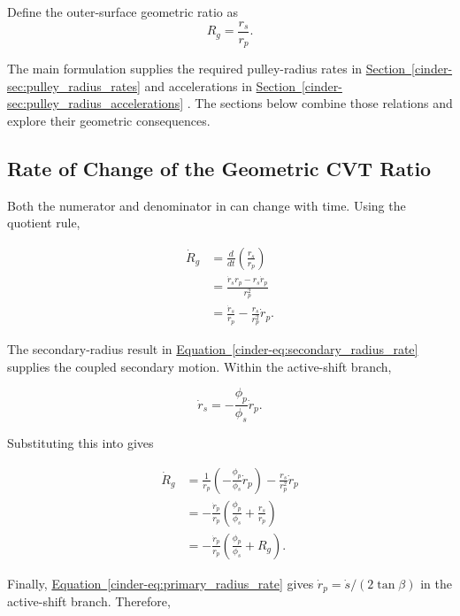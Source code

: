 \documentclass[11pt]{report}
\newcommand{\FormEq}[1]{%
    \hyperref[cinder-#1]{Equation~\ref*{cinder-#1}}%
  }
\newcommand{\FormSec}[1]{%
    \hyperref[cinder-#1]{Section~\ref*{cinder-#1}}%
  }
\newcommand{\FormEq}[1]{\textit{main formulation equation \nolinkurl{#1}}}
\newcommand{\FormSec}[1]{\textit{main formulation section \nolinkurl{#1}}}
\begin{document}
Define the outer-surface geometric ratio as
\begin{equation}
R_g=\frac{r_s}{r_p}.
\label{eq:geometric_ratio_recalled}
\end{equation}

The main formulation supplies the required pulley-radius rates in
\FormSec{sec:pulley_radius_rates} and accelerations in
\FormSec{sec:pulley_radius_accelerations}. The sections below combine those
relations and explore their geometric consequences.

\subsection{Rate of Change of the Geometric CVT Ratio}

Both the numerator and denominator in  can
change with time. Using the quotient rule,

\begin{align}
\dot R_g
&=
\frac{d}{dt}
\left(
\frac{r_s}{r_p}
\right)
\nonumber\\
&=
\frac{
\dot r_s r_p-r_s\dot r_p
}
{r_p^2}
\nonumber\\
&=
\frac{\dot r_s}{r_p}
-
\frac{r_s}{r_p^2}\dot r_p.
\label{eq:geometric_ratio_rate_general}
\end{align}

The secondary-radius result in \FormEq{eq:secondary_radius_rate} supplies the
coupled secondary motion. Within the active-shift branch,

\begin{equation}
\dot r_s
=
-\frac{\phi_p}{\phi_s}\dot r_p.
\label{eq:geometric_ratio_secondary_rate_substitution}
\end{equation}

Substituting this into  gives

\begin{align}
\dot R_g
&=
\frac{1}{r_p}
\left(
-\frac{\phi_p}{\phi_s}\dot r_p
\right)
-
\frac{r_s}{r_p^2}\dot r_p
\nonumber\\
&=
-\frac{\dot r_p}{r_p}
\left(
\frac{\phi_p}{\phi_s}
+
\frac{r_s}{r_p}
\right)
\nonumber\\
&=
-\frac{\dot r_p}{r_p}
\left(
\frac{\phi_p}{\phi_s}
+
R_g
\right).
\label{eq:geometric_ratio_rate_primary_form}
\end{align}

Finally, \FormEq{eq:primary_radius_rate} gives
\(\dot r_p=\dot s/(2\tan\beta)\) in the active-shift branch. Therefore,
\end{document}
